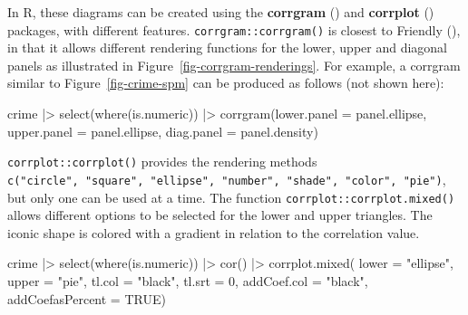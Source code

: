 \documentclass[
  letterpaper,
  10pt,
  krantz2]{krantz}
\makeatletter
\newenvironment{Shaded}{\begin{snugshade}}{\end{snugshade}}
\newcommand{\AttributeTok}[1]{\textcolor[rgb]{0.40,0.45,0.13}{#1}}
\newcommand{\ConstantTok}[1]{\textcolor[rgb]{0.56,0.35,0.01}{#1}}
\newcommand{\DecValTok}[1]{\textcolor[rgb]{0.68,0.00,0.00}{#1}}
\newcommand{\FunctionTok}[1]{\textcolor[rgb]{0.28,0.35,0.67}{#1}}
\newcommand{\NormalTok}[1]{\textcolor[rgb]{0.00,0.23,0.31}{#1}}
\newcommand{\SpecialCharTok}[1]{\textcolor[rgb]{0.37,0.37,0.37}{#1}}
\newcommand{\StringTok}[1]{\textcolor[rgb]{0.13,0.47,0.30}{#1}}
\newenvironment{kframe}{%
  \medskip{}
  \setlength{\fboxsep}{.8em}
  \def\at@end@of@kframe{}%
  \ifinner\ifhmode%
  \def\at@end@of@kframe{\end{minipage}}%
  \begin{minipage}{\columnwidth}%
  \fi\fi%
  \def\FrameCommand##1{\hskip\@totalleftmargin \hskip-\fboxsep
  \colorbox{shadecolor}{##1}\hskip-\fboxsep
      \hskip-\linewidth \hskip-\@totalleftmargin \hskip\columnwidth}%
  \MakeFramed {\advance\hsize-\width
    \@totalleftmargin\z@ \linewidth\hsize
    \@setminipage}}%
{\par\unskip\endMakeFramed%
  \at@end@of@kframe}
\renewenvironment{Shaded}{\begin{kframe}}{\end{kframe}}
\makeatother
\begin{document}
In R, these diagrams can be created using the \textbf{corrgram}
() and \textbf{corrplot}
() packages, with different
features. \texttt{corrgram::corrgram()} is closest to Friendly
(), in that it allows different
rendering functions for the lower, upper and diagonal panels as
illustrated in Figure~\ref{fig-corrgram-renderings}. For example, a
corrgram similar to Figure~\ref{fig-crime-spm} can be produced as
follows (not shown here):

\begin{Shaded}
\begin{Highlighting}[]
\NormalTok{crime }\SpecialCharTok{|\textgreater{}}
  \FunctionTok{select}\NormalTok{(}\FunctionTok{where}\NormalTok{(is.numeric)) }\SpecialCharTok{|\textgreater{}}
  \FunctionTok{corrgram}\NormalTok{(}\AttributeTok{lower.panel =}\NormalTok{ panel.ellipse,}
           \AttributeTok{upper.panel =}\NormalTok{ panel.ellipse,}
           \AttributeTok{diag.panel =}\NormalTok{ panel.density)}
\end{Highlighting}
\end{Shaded}

\texttt{corrplot::corrplot()} provides the rendering methods
\texttt{c("circle",\ "square",\ "ellipse",\ "number",\ "shade",\ "color",\ "pie")},
but only one can be used at a time. The function
\texttt{corrplot::corrplot.mixed()} allows different options to be
selected for the lower and upper triangles. The iconic shape is colored
with a gradient in relation to the correlation value.

\begin{Shaded}
\begin{Highlighting}[]
\NormalTok{crime }\SpecialCharTok{|\textgreater{}}
  \FunctionTok{select}\NormalTok{(}\FunctionTok{where}\NormalTok{(is.numeric)) }\SpecialCharTok{|\textgreater{}}
  \FunctionTok{cor}\NormalTok{() }\SpecialCharTok{|\textgreater{}}
  \FunctionTok{corrplot.mixed}\NormalTok{(}
           \AttributeTok{lower =} \StringTok{"ellipse"}\NormalTok{,}
           \AttributeTok{upper =} \StringTok{"pie"}\NormalTok{,}
           \AttributeTok{tl.col =} \StringTok{"black"}\NormalTok{,}
           \AttributeTok{tl.srt =} \DecValTok{0}\NormalTok{,}
           \AttributeTok{addCoef.col =} \StringTok{"black"}\NormalTok{,}
           \AttributeTok{addCoefasPercent =} \ConstantTok{TRUE}\NormalTok{)}
\end{Highlighting}
\end{Shaded}
\end{document}
